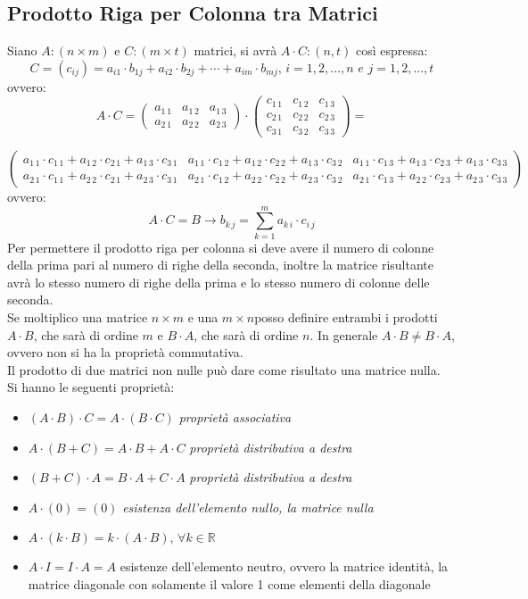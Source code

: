 \documentclass[a4paper,12pt, oneside]{book}
\begin{document}
\subsection{Prodotto Riga per Colonna tra Matrici}
Siano $A:(n\times m)$ e $C:(m\times t)$ matrici, si avrà $A\cdot C:(n,t)$ così espressa:
$$C=(c_{ij})=a_{i1}\cdot b_{1j}+a_{i2}\cdot b_{2j}+\cdots+a_{im}\cdot b_{mj},\, i=1,2,... ,n\,\, e\,\, j=1,2,... ,t$$
ovvero:
$$
A\cdot C=
\left(\begin{matrix}
a_{1\,1} & a_{1\,2} & a_{1\,3}\\
a_{2\,1} & a_{2\,2} & a_{2\,3}
\end{matrix}\right)
\cdot
\left(\begin{matrix}
c_{1\,1} & c_{1\,2}  & c_{1\,3}\\
c_{2\,1} & c_{2\,2} & c_{2\,3}\\
c_{3\,1} & c_{3\,2} & c_{3\,3}
\end{matrix}\right)=
$$

$$
\left(\begin{matrix}
a_{1\,1}\cdot c_{1\,1}+a_{1\,2}\cdot c_{2\,1}+a_{1\,3}\cdot c_{3\,1} & a_{1\,1}\cdot c_{1\,2}+a_{1\,2}\cdot c_{2\,2}+a_{1\,3}\cdot c_{3\,2} & a_{1\,1}\cdot c_{1\,3}+a_{1\,3}\cdot c_{2\,3}+a_{1\,3}\cdot c_{3\,3}\\
a_{2\,1}\cdot c_{1\,1}+a_{2\,2}\cdot c_{2\,1}+a_{2\,3}\cdot c_{3\,1} & a_{2\,1}\cdot c_{1\,2}+a_{2\,2}\cdot c_{2\,2}+a_{2\,3}\cdot c_{3\,2} & a_{2\,1}\cdot c_{1\,3}+a_{2\,2}\cdot c_{2\,3}+a_{2\,3}\cdot c_{3\,3}
\end{matrix}\right)
$$
ovvero:
$$ A\cdot C=B\rightarrow b_{k\,j}=\sum_{k=1}^{m} a_{k\,i}\cdot c_{i\,j}$$
Per permettere il prodotto riga per colonna si deve avere il numero di colonne della prima pari al numero di righe della seconda, inoltre la matrice risultante avrà lo stesso numero di righe della prima e lo stesso numero di colonne delle seconda.\\
Se moltiplico una matrice $n\times m$ e una $m\times n$posso definire entrambi i prodotti $A\cdot B$, che sarà di ordine $m$ e $B\cdot A$, che sarà di ordine $n$. In generale $A\cdot B \neq B\cdot A$, ovvero non si ha la proprietà commutativa.\\
Il prodotto di due matrici non nulle può dare come risultato una matrice nulla.\\
Si hanno le seguenti proprietà:
\begin{itemize}
\item $(A\cdot B)\cdot C=A\cdot (B\cdot C)$ \textit{proprietà associativa}
\item $A\cdot(B+C)=A\cdot B+A\cdot C$ \textit{proprietà distributiva  a destra}
\item $(B+C)\cdot A=B\cdot A+C\cdot A$ \textit{proprietà distributiva a destra}
\item $A\cdot (0)=(0)$ \textit{esistenza dell'elemento nullo, la matrice nulla}
\item $A\cdot(k\cdot B)=k\cdot(A\cdot B),\, \forall k\in \mathbb{R}$ 
\item $A\cdot I=I\cdot A=A$ {esistenze dell'elemento neutro, ovvero la matrice identità, la matrice diagonale con solamente il valore 1 come elementi della diagonale}
\end{itemize}
\end{document}

